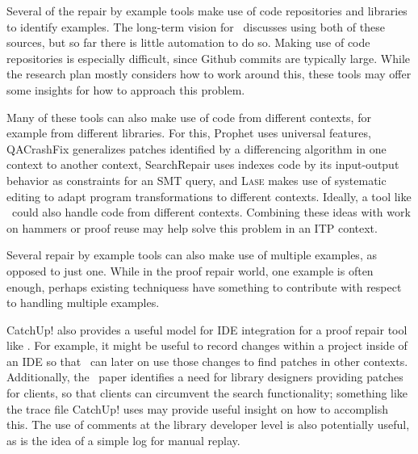 Several of the repair by example tools make use of code repositories and libraries to identify examples.
The long-term vision for \sysname\ discusses using both of these sources, but so far there is little automation
to do so. Making use of code repositories is especially difficult, since Github commits are typically large.
While the research plan mostly considers how to work around this, %
these tools may offer some insights for how to approach this problem.

Many of these tools can also make use of code from different contexts, for example from different libraries. %
For this, Prophet uses universal features, QACrashFix generalizes patches identified by a differencing algorithm in one context to another context,
SearchRepair uses indexes code by its input-output behavior as constraints for an SMT query,
and \textsc{Lase} makes use of systematic editing to adapt program transformations to different contexts.
Ideally, a tool like \sysname\ could also handle code from different contexts. %
Combining these ideas with work on hammers or proof reuse may help solve this problem
in an ITP context.

Several repair by example tools can also make use of multiple examples, as opposed to just one.
While in the proof repair world, one example is often %
enough, perhaps existing techniquess have something to contribute with respect to handling multiple examples. %

CatchUp! also provides a useful model for IDE integration for a proof repair tool like \sysname.
For example, it might be useful to record changes within a project inside of an IDE 
so that \sysname\ can later on use those changes to find patches in other contexts. %
Additionally, the \sysname\ paper identifies a need for library designers providing patches for clients,
so that clients can circumvent the search functionality; something like the trace file CatchUp! 
uses may provide useful insight on how to accomplish this. %
The use of comments at the library developer level is also potentially useful, as is the idea of a simple log for manual replay.

